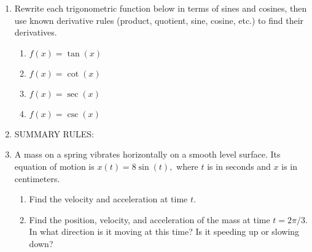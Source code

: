 \documentclass[11pt,fleqn]{article}
\begin{document}
\begin{enumerate}
\item Rewrite each trigonometric function below in terms of sines and cosines, then use known derivative rules (product, quotient, sine, cosine, etc.) to find their derivatives. \\
	\begin{enumerate}
	\item $f(x)=\tan(x)$
	\vfill
	\item $f(x)=\cot(x)$
	\vfill
	\item $f(x)=\sec(x)$
	\vfill
\newpage
	\item $f(x)=\csc(x)$
	\vspace{1in}
	\end{enumerate}
\item SUMMARY RULES:\\
\vspace{1.5in}
\item A mass on a spring vibrates horizontally on a smooth level surface. Its equation of motion is $x(t)=8 \sin(t),$  where $t$ is in seconds and $x$ is in centimeters.\\
	\begin{enumerate}
	\item Find the velocity and acceleration at time $t.$
	\vspace{1.5in}
	\item Find the position, velocity, and acceleration of the mass at time $t=2\pi / 3.$ In what direction is it moving at this time? Is it speeding up or slowing down?
	\vfill
	\end{enumerate}
\end{enumerate}
\end{document}
